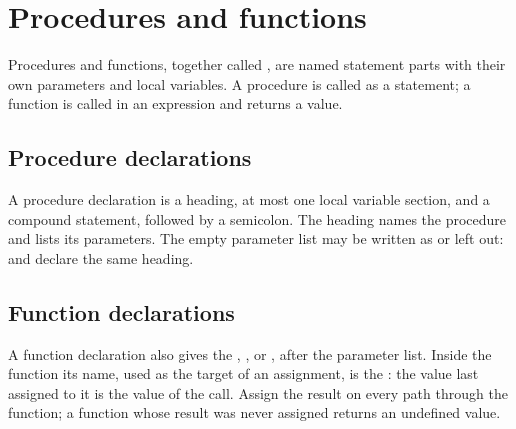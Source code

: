 \chapter{Procedures and functions}

Procedures and functions, together called , are named
statement parts with their own parameters and local variables.  A
procedure is called as a statement; a function is called in an expression
and returns a value.

\section{Procedure declarations}

A procedure declaration is a heading, at most one local variable section,
and a compound statement, followed by a semicolon.  The heading names the
procedure and lists its parameters.  The empty parameter list may be
written as \code{()} or left out:  and
 declare the same heading.

\section{Function declarations}

A function declaration also gives the , ,
 or , after the parameter list.  Inside the function
its name, used as the target of an assignment, is the : the value last assigned to it is the value of the call.  Assign
the result on every path through the function; a function whose result was
never assigned returns an undefined value.

